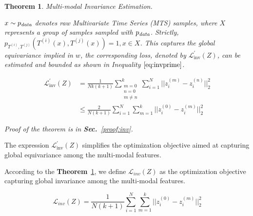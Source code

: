\documentclass{article}
\newtheorem{theorem}{\textbf{Theorem}} %
\begin{document}
\begin{theorem}\label{the:inv_est}
Multi-modal Invariance Estimation.

$x \sim p_{\text{\textit{data}}}$ denotes raw Multivariate Time Series (MTS) samples, where $X$ represents a group of samples sampled with $p_{\text{\textit{data}}}$. Strictly, $p_{T^{(i)}, T^{(j)}}(T^{(i)}(x), T^{(j)}(x)) = 1, x \in X$. This captures the global equivariance implied in $w$, the corresponding loss, denoted by $\mathcal{L}_{\text{inv}}^\prime(Z)$, can be estimated and bounded as shown in Inequality $\ref{eq:invprime}$.

\begin{equation}\label{eq:invprime}
\begin{aligned}
    \mathcal{L}_{\text{inv}}^\prime(Z) & = \frac{1}{Nk(k+1)}\sum_{\substack{m=0 \\ n=0 \\ m \neq n}}^{k} \sum_{i=1}^N ||z_i^{(m)} - z_i^{(n)}||^2_2 \\
    & \leq \frac{2}{N(k+1)} \sum_{i=1}^N\sum_{m=1}^k ||z^{(0)}_i - z^{(m)}_i||^2_2
\end{aligned}
\end{equation}

Proof of the theorem is in \textbf{Sec.}~\ref{proof:inv}.
\end{theorem}
The expression \( \mathcal{L}_{\text{inv}}^\prime(Z) \) simplifies the optimization objective aimed at capturing global equivariance among the multi-modal features.


According to the \textbf{Theorem}~\ref{the:inv_est}, we define $\mathcal{L}_{inv}(Z)$ as the optimization objective capturing global invariance among the multi-modal features.

\begin{equation}\label{eq:inv}
    \mathcal{L}_{inv}(Z) = \frac{1}{N(k+1)} \sum_{i=1}^N \sum_{m=1}^k ||z^{(0)}_i - z^{(m)}_i||^2_2
\end{equation}
\end{document}
